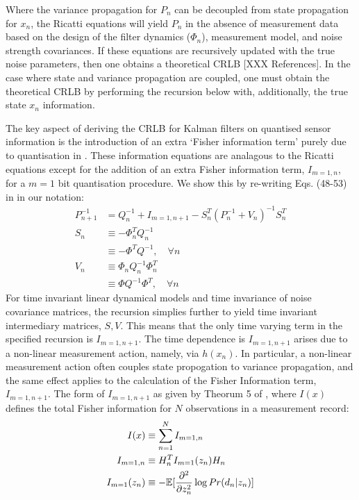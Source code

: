 Where the variance propagation for $P_n$ can be decoupled from state propagation for $x_n$, the Ricatti equations will yield $P_n$ in the absence of measurement data based on the design of the filter dynamics ($\Phi_n$), measurement model, and noise strength covariances.  If these equations are recursively updated with the true noise parameters, then one obtains a theoretical CRLB [XXX References]. In the case where state and variance propagation are coupled, one must obtain the theoretical CRLB by performing the recursion below with, additionally, the true state $x_n$ information. 

The key aspect of deriving the CRLB for Kalman filters on quantised sensor information is the introduction of an extra `Fisher information term' purely due to quantisation in \cite{karlsson2005}. These information equations are analagous to the Ricatti equations except for the addition of an extra Fisher information term, $I_{m=1, n}$, for a $m=1$ bit quantisation procedure. We show this by re-writing Eqs. (48-53) in \cite{karlsson2005} in our notation:
\begin{align}
P_{n+1}^{-1} &= Q_n^{-1} + I_{m=1, n+1} - S_n^T(P^{-1}_n + V_n)^{-1} S^T_n \label{eqn:app:CRLB_recursion} \\
S_n &\equiv -\Phi_n^T Q_n^{-1} \\
&\equiv -\Phi^T Q^{-1}, \quad \forall n \\
V_n & \equiv \Phi_n Q_n^{-1} \Phi_n^T\\
& \equiv \Phi Q^{-1} \Phi^T , \quad \forall n 
\end{align} 
For time invariant linear dynamical models and time invariance of noise covariance matrices, the recursion simplies further to yield time invariant intermediary matrices, $S, V$. This means that the only time varying term in the specified recursion is $I_{m=1, n+1}$. The time dependence is  $I_{m=1, n+1}$ arises due to a non-linear measurement action, namely, via $h(x_n)$. In particular, a non-linear measurement action often couples state propogation to variance propagation, and the same effect applies to the calculation of the Fisher Information term, $I_{m=1, n+1}$. The form of $I_{m=1, n+1}$ as given by Theorum 5 of \cite{karlsson2005}, where $I(x)$ defines the total Fisher information for $N$ observations in a measurement record:
\begin{align}
I(x) & \equiv \sum_{n=1}^{N} I_{m=1, n} \\
I_{m=1, n} & \equiv  H_n^T I_{m=1}(z_n) H_n  \\
I_{m=1}(z_n) & \equiv - \mathbb{E}[\frac{\partial^2}{\partial z_n^2} \log Pr(d_n|z_n)] \label{eqn:app:quantisedFisherinfo}
\end{align}

